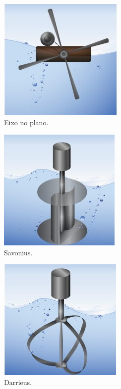 \begin{figure}
	\centering
	\begin{subfigure}{0.31\textwidth}
		\centering
		\includegraphics[scale=0.9]{figuras/VermaakVa.jpg}
		\caption{Eixo no plano.}
		\label{subfig:Inplane}
	\end{subfigure}
	\begin{subfigure}{0.31\textwidth}
		\centering
		\includegraphics[scale=0.9]{figuras/VermaakVf.jpg}
		\caption{Savonius.}
		\label{subfig:Savonius}
	\end{subfigure}
	\begin{subfigure}{0.31\textwidth}
		\centering
		\includegraphics[scale=0.9]{figuras/VermaakVd.jpg}
		\caption{Darrieus.}
		\label{subfig:Darrieus}
	\end{subfigure}
	\begin{subfigure}{0.31\textwidth}

\end{subfigure}
\end{figure}

